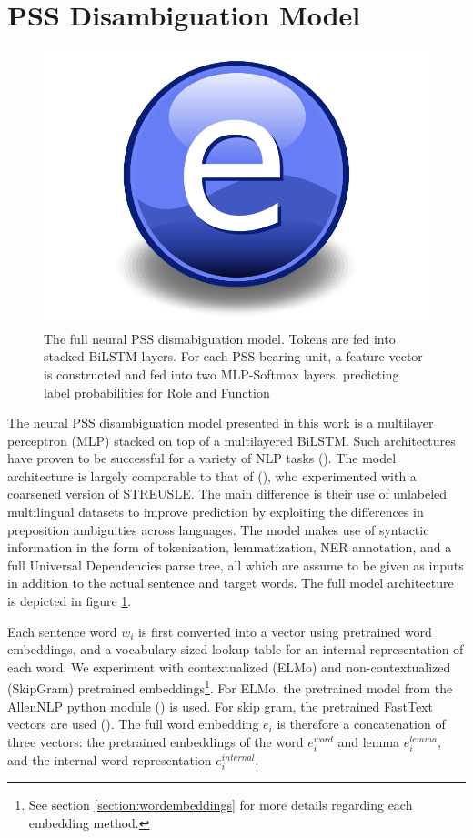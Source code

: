 \section{PSS Disambiguation Model} \label{sec:pssdisambg}

\begin{figure}
    \centering
    \includegraphics{Figures/Electron.pdf}
    \caption{The full neural PSS dismabiguation model. Tokens are fed into stacked BiLSTM layers. For each PSS-bearing unit, a feature vector is constructed and fed into two MLP-Softmax layers, predicting label probabilities for Role and Function}
    \label{fig:pssmodel}
\end{figure}

The neural PSS disambiguation model presented in this work is a multilayer perceptron (MLP) stacked on top of a multilayered BiLSTM. Such architectures have proven to be successful for a variety of NLP tasks (\cite{kiperwasser16simple, elmo}). The model architecture is largely comparable to that of (\cite{gonen16semi}), who experimented with a coarsened version of STREUSLE. The main difference is their use of unlabeled multilingual datasets to improve prediction by exploiting the differences in preposition ambiguities across languages. The model makes use of syntactic information in the form of tokenization, lemmatization, NER annotation, and a full Universal Dependencies parse tree, all which are assume to be given as inputs in addition to the actual sentence and target words.  The full model architecture is depicted in figure \ref{fig:pssmodel}. 

Each sentence word $w_i$ is first converted into a vector using pretrained word embeddings, and a vocabulary-sized lookup table for an internal representation of each word. We experiment with contextualized (ELMo) and non-contextualized (SkipGram) pretrained embeddings\footnote{See section \ref{section:wordembeddings} for more details regarding each embedding method.}. For ELMo, the pretrained model from the AllenNLP python module (\cite{allennlp}) is used. For skip gram, the pretrained FastText vectors are used (\cite{fasttext}). The full word embedding $e_i$ is therefore a concatenation of three vectors: the pretrained embeddings of the word $e^{word}_i$ and lemma $e^{lemma}_i$, and the internal word representation $e^{internal}_i$. 

